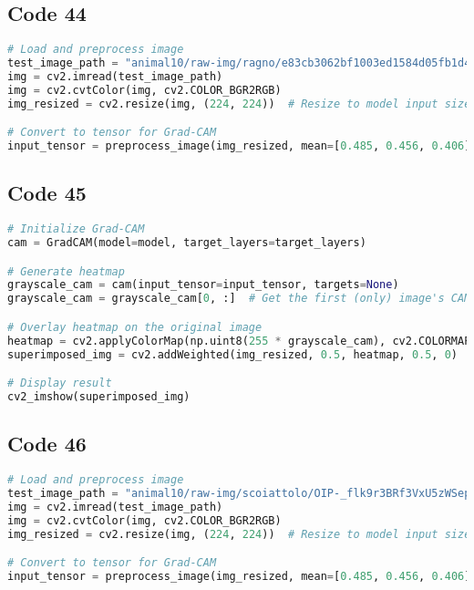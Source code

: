 \documentclass{article}
\begin{document}
\subsection*{Code 44}
\begin{lstlisting}[language=Python]
# Load and preprocess image
test_image_path = "animal10/raw-img/ragno/e83cb3062bf1003ed1584d05fb1d4e9fe777ead218ac104497f5c97ca5edb3bd_640.jpg"  # Change path to an actual image
img = cv2.imread(test_image_path)
img = cv2.cvtColor(img, cv2.COLOR_BGR2RGB)
img_resized = cv2.resize(img, (224, 224))  # Resize to model input size

# Convert to tensor for Grad-CAM
input_tensor = preprocess_image(img_resized, mean=[0.485, 0.456, 0.406], std=[0.229, 0.224, 0.225])
\end{lstlisting}

\subsection*{Code 45}
\begin{lstlisting}[language=Python]
# Initialize Grad-CAM
cam = GradCAM(model=model, target_layers=target_layers)

# Generate heatmap
grayscale_cam = cam(input_tensor=input_tensor, targets=None)
grayscale_cam = grayscale_cam[0, :]  # Get the first (only) image's CAM

# Overlay heatmap on the original image
heatmap = cv2.applyColorMap(np.uint8(255 * grayscale_cam), cv2.COLORMAP_JET)
superimposed_img = cv2.addWeighted(img_resized, 0.5, heatmap, 0.5, 0)

# Display result
cv2_imshow(superimposed_img)
\end{lstlisting}

\subsection*{Code 46}
\begin{lstlisting}[language=Python]
# Load and preprocess image
test_image_path = "animal10/raw-img/scoiattolo/OIP-_flk9r3BRf3VxU5zWSep5QHaE8.jpeg"  # Change path to an actual image
img = cv2.imread(test_image_path)
img = cv2.cvtColor(img, cv2.COLOR_BGR2RGB)
img_resized = cv2.resize(img, (224, 224))  # Resize to model input size

# Convert to tensor for Grad-CAM
input_tensor = preprocess_image(img_resized, mean=[0.485, 0.456, 0.406], std=[0.229, 0.224, 0.225])
\end{lstlisting}
\end{document}
